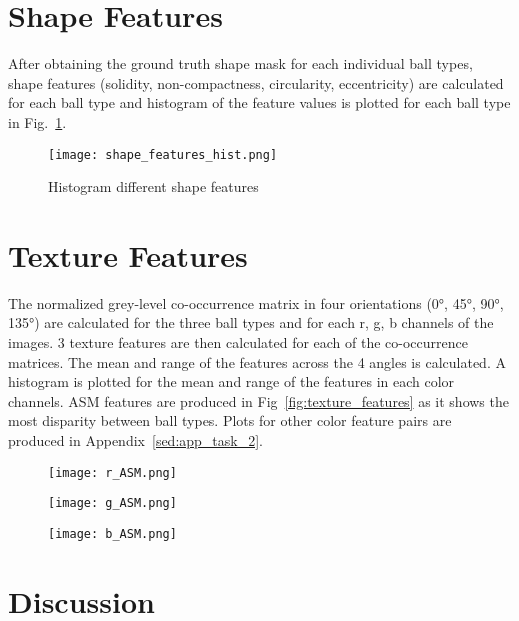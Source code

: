 \documentclass{report}
\begin{document}
\section{Shape Features}

After obtaining the ground truth shape mask for each individual ball types, shape features (solidity, non-compactness, circularity, eccentricity) are calculated for each ball type and histogram of the feature values is plotted for each ball type in Fig.~\ref{fig:shape_features_hist}.

\begin{figure}[ht]
    \centering
    \texttt{[image: shape\_features\_hist.png]}
    \caption{Histogram different shape features}
    \label{fig:shape_features_hist}
\end{figure}

\section{Texture Features}

The normalized grey-level co-occurrence matrix in four orientations (0°, 45°, 90°, 135°) are calculated for the three ball types and for each r, g, b channels of the images. 3 texture features are then calculated for each of the co-occurrence matrices. The mean and range of the features across the 4 angles is calculated. A histogram is plotted for the mean and range of the features in each color channels. ASM features are produced in Fig~\ref{fig:texture_features} as it shows the most disparity between ball types. Plots for other color feature pairs are produced in Appendix~\ref{sed:app_task_2}.

\begin{figure}[ht]
    \texttt{[image: r\_ASM.png]}
    \label{fig:r_ASM}
\end{figure}

\begin{figure}[ht]
    \texttt{[image: g\_ASM.png]}
    \label{fig:g_ASM}
\end{figure}

\begin{figure}[ht]
    \texttt{[image: b\_ASM.png]}
    \label{fib:g_ASM}
\end{figure}

\section{Discussion}
\end{document}
